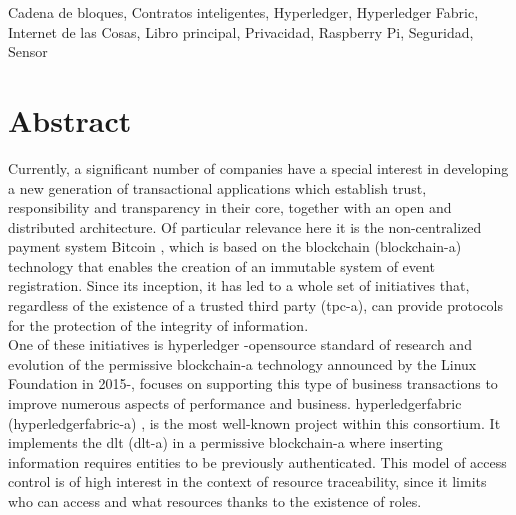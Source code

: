 \documentclass[12pt,a4paper, twoside]{report}
\newcommand{\blankpage}{
				\newpage
				\thispagestyle{empty}
				\mbox{}
				\newpage
				}
\begin{document}
	Cadena de bloques, Contratos inteligentes, Hyperledger, Hyperledger Fabric, Internet de las Cosas, Libro principal, Privacidad, Raspberry Pi, Seguridad, Sensor
			
	\blankpage
	
	\chapter*{Abstract}
	\thispagestyle{empty}
		
	\vspace{-0.3cm}

	Currently, a significant number of companies have a special interest in developing a new generation of transactional applications which establish trust, responsibility and transparency in their core, together with an open and distributed architecture. Of particular relevance here it is the non-centralized payment system Bitcoin \cite{franco:2014:UB}, which is based on the \Gls{blockchain} (\gls{blockchain-a}) \cite{iansiti:2017:ttab} technology that enables the creation of an immutable system of event registration. Since its inception, it has led to a whole set of initiatives that, regardless of the existence of a trusted third party (\gls{tpc-a}), can provide protocols for the protection of the integrity of information. \\
		
	One of these initiatives is \gls{hyperledger} \cite{hyperledger:url} -\gls{opensource} standard of research and evolution of the permissive \gls{blockchain-a} technology announced by the Linux Foundation in 2015-, focuses on supporting this type of business \glspl{transaction} to improve numerous aspects of performance and business. \gls{hyperledgerfabric} (\gls{hyperledgerfabric-a}) \cite{hyperledgerfabric:url}, is the most well-known project within this consortium. It implements the \gls{dlt} (\gls{dlt-a}) \cite{wattenhofer:DLT} in a permissive \gls{blockchain-a} where inserting information requires entities to be previously authenticated. This model of access control is of high interest in the context of resource traceability, since it limits who can access and what resources thanks to the existence of roles. \\
	
\end{document}
